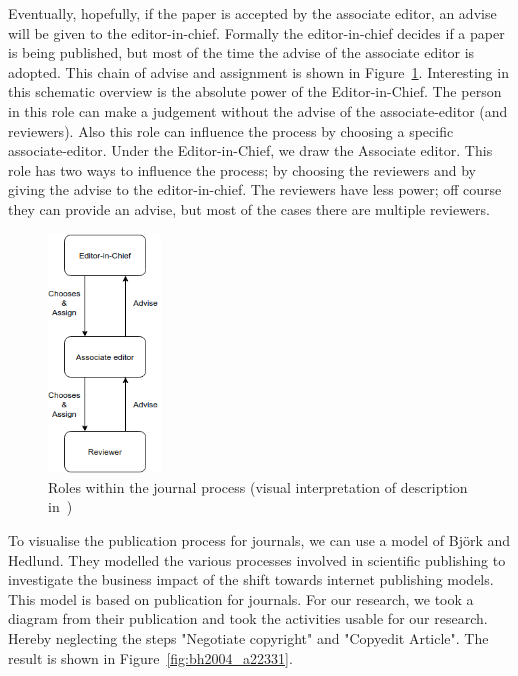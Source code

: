 \documentclass{ou-report}
\newcommand{\outline}[1]{{\color{blue} #1}}
\begin{document}
Eventually, hopefully, if the paper is accepted by the associate editor, an 
advise will be given to the editor-in-chief. Formally the editor-in-chief 
decides if a paper is being published, but most of the time the advise of the 
associate editor is adopted. This chain of advise and assignment is shown in 
Figure~\ref{fig:c2013}. Interesting in this schematic overview is the absolute 
power of the Editor-in-Chief. The person in this role can make a judgement without the advise of the 
associate-editor (and reviewers). Also this role can influence the process by 
choosing a specific associate-editor. Under the Editor-in-Chief, we draw the 
Associate editor. This role has two ways to influence the process; by choosing 
the reviewers and by giving the advise to the editor-in-chief. The reviewers 
have less power; off course they can provide an advise, but most of the cases 
there are multiple reviewers.

\begin{figure}[H]
\centering
\includegraphics[width=3cm]{images/c2013.drawio.png}
\caption{Roles within the journal process (visual interpretation of description in~\cite{C2013})}
\label{fig:c2013}
\end{figure}
To visualise the publication process for journals, we can use a model of 
Bj\"ork and Hedlund. They modelled the various processes involved in scientific
publishing to investigate the business impact of the shift towards internet
publishing models. This model is based on publication for journals.
For our research, we took a diagram from their publication and took the 
activities usable for our research. Hereby neglecting the steps 
"Negotiate copyright" and "Copyedit Article". The result is shown in 
Figure~\ref{fig:bh2004_a22331}.
\end{document}
